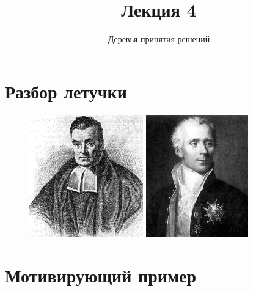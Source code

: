 \documentclass[10pt]{beamer}
\title{Лекция 4}
\subtitle{Деревья принятия решений}
\begin{document}
\maketitle

\section{Разбор летучки}

\begin{frame}{}
	\centering
	\begin{figure}
		\begin{minipage}{.5\textwidth}
		  \includegraphics[width=0.9 \linewidth, height=150pt, keepaspectratio]{images/bayes}
		\end{minipage}%
		\begin{minipage}{.5\textwidth}				
			\includegraphics[width=0.9 \linewidth, height=150pt, keepaspectratio]{images/laplace}
		\end{minipage}
	\end{figure}
\end{frame}

\section{Мотивирующий пример}
\end{document}
